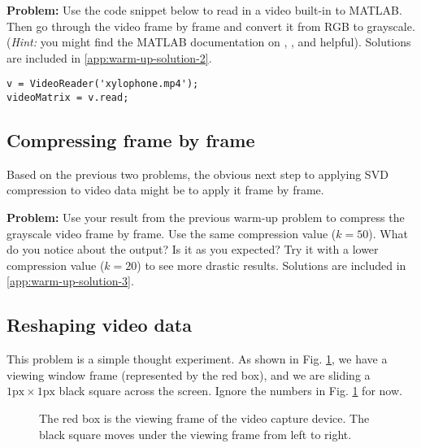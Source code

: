 \textbf{Problem:} Use the code snippet below to read in a video built-in to MATLAB. Then go through the video frame by frame and convert it from RGB to grayscale. (\textit{Hint:} you might find the MATLAB documentation on , , and  helpful). Solutions are included in \ref{app:warm-up-solution-2}.
\begin{lstlisting}[style=code]
v = VideoReader('xylophone.mp4');
videoMatrix = v.read;
\end{lstlisting}

\subsection{Compressing frame by frame}
Based on the previous two problems, the obvious next step to applying SVD compression to video data might be to apply it frame by frame.

\textbf{Problem:} Use your result from the previous warm-up problem to compress the grayscale video frame by frame. Use the same compression value ($k = 50$). What do you notice about the output? Is it as you expected? Try it with a lower compression value ($k = 20$) to see more drastic results. Solutions are included in \ref{app:warm-up-solution-3}.

\subsection{Reshaping video data}
This problem is a simple thought experiment. As shown in Fig. \ref{fig:warm-up-4-experiment}, we have a viewing window frame (represented by the red box), and we are sliding a $1\text{px} \times 1\text{px}$ black square across the screen. Ignore the numbers in Fig. \ref{fig:warm-up-4-experiment} for now.
\begin{figure}[ht]
	\centering
	\caption{The red box is the viewing frame of the video capture device. The black square moves under the viewing frame from left to right.}
	\label{fig:warm-up-4-experiment}
\end{figure}

